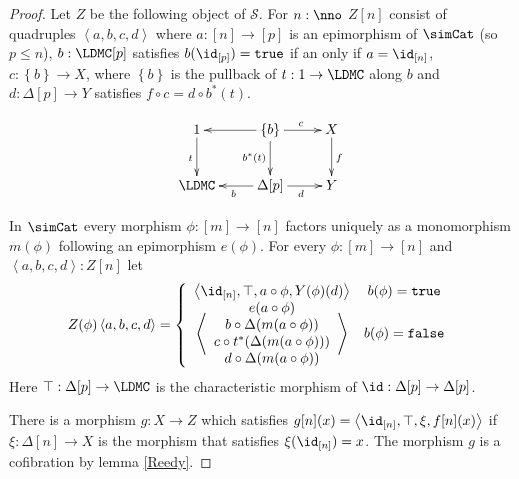 \documentclass{tac}
\newcommand\cat\mathcal
\newcommand\set[1]{\left\{#1\right\}}
\newcommand\ri{^*}
\newcommand\of{:}
\newcommand\simplex\Delta
\newcommand\tuplet[1]{\left\langle #1 \right\rangle}
\newcommand\true{\mathtt{true}}
\newcommand\false{\mathtt{false}}
\begin{document}
\begin{proof}
Let $Z$ be the following object of $\cat S$. For $n\of\nno$ $Z[n]$ consist of quadruples $\tuplet{a,b,c,d}$ where 
 $a\of[n]\to [p]$ is an epimorphism of $\simCat$ (so $p\leq n$),
 $b\of\LDMC[p]$ satisfies $b(\id_{[p]})=\true$ if an only if $a=\id_{[n]}$,
 $c\of \set{b}\to X$, where $\set{b}$ is the pullback of $t\of 1\to\LDMC$ along $b$ and 
 $d\of \simplex[p]\to Y$ satisfies $f\circ c = d\circ b\ri(t)$.

\[\xymatrix{
1\ar[d]_t & \set b\ar[l]\ar[d]_{b\ri(t)}\ar[r]^{c} & X\ar[d]^f \\
\LDMC & \simplex[p]\ar[l]^b\ar[r]_d & Y
}\]

In $\simCat$ every morphism $\phi\of [m]\to[n]$ factors uniquely as a monomorphism $m(\phi)$ following an epimorphism $e(\phi)$. For every $\phi\of [m]\to [n]$ and $\tuplet{a,b,c,d}\of Z[n]$ let
\[ Z(\phi)\tuplet{a,b,c,d} = \left\{\begin{array}{cc}
\tuplet{\id_{[n]},\top,a\circ\phi,Y(\phi)(d)} & b(\phi)=\true \\
\tuplet{\begin{array}{c} e(a\circ \phi)\\ b\circ \simplex(m(a\circ \phi))\\ c \circ t\ri(\simplex(m(a\circ \phi)))\\ d\circ\simplex(m(a\circ \phi))\end{array}} & b(\phi)=\false
\end{array}\right.
\]
Here $\top\of \simplex[p]\to\LDMC$ is the characteristic morphism of $\id\of\simplex[p]\to\simplex[p]$.

There is a morphism $g\of X\to Z$ which satisfies $g[n](x) = \tuplet{\id_{[n]},\top,\xi,f[n](x)}$ if $\xi\of\simplex[n] \to X$ is the morphism that satisfies $\xi(\id_{[n]})=x$. The morphism $g$ is a cofibration by lemma \ref{Reedy}.


\end{proof}
\end{document}
